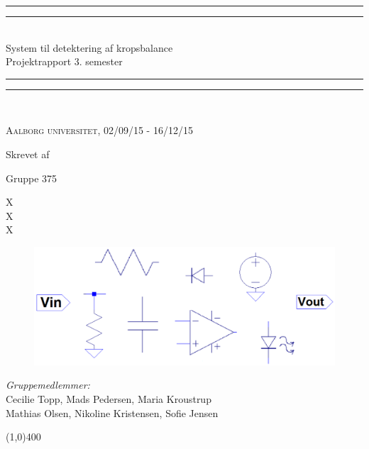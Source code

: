 \begin{center}
\vspace*{\baselineskip}
\rule{\textwidth}{1.6pt}\vspace*{-\baselineskip}\vspace*{2pt} %
\rule{\textwidth}{0.4pt}\\[\baselineskip] %

{\huge System til detektering af kropsbalance\\[0.3\baselineskip] \LARGE Projektrapport 3. semester}\\[0.2\baselineskip] %

\rule{\textwidth}{0.4pt}\vspace*{-\baselineskip}\vspace{3.2pt} %
\rule{\textwidth}{1.6pt}\\[\baselineskip] %
\vspace*{3\baselineskip}

\scshape %
Aalborg universitet,  02/09/15 - 16/12/15 \par %

\vspace*{2\baselineskip} %

Skrevet af \\
{\Large Gruppe 375\par}
\end{center} %
{\color{white}X \\ X \\ X \\}
\begin{figure}[H]
	\centering
	\begin{minipage}[b]{1\textwidth}
		\includegraphics[width=\textwidth]{figures/Forside1.PNG}
	\end{minipage}
	\hfill
\end{figure}

\vspace*{\fill}
\begin{center}
	\textit{Gruppemedlemmer:}\\
	Cecilie Topp, Mads Pedersen, Maria Kroustrup \\
	Mathias Olsen, Nikoline Kristensen, Sofie Jensen
\end{center}
\begin{center}
\line(1,0){400}
\end{center}
